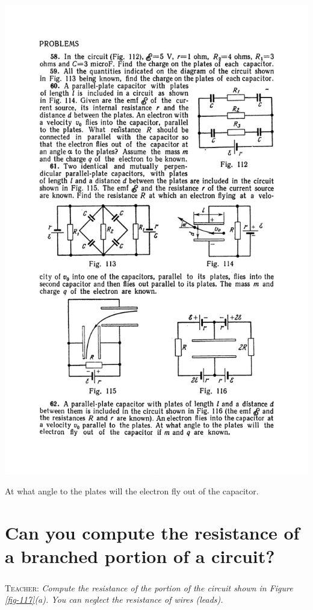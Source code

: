 \documentclass[a4paper,sfsidenotes]{tufte-book}
\begin{document}
\begin{enumerate}[resume=problems]
\begin{marginfigure}
\includegraphics[width=\linewidth]{fig-116a}
\caption{ At what angle to the plates will the electron fly out of the capacitor.}
\label{fig-116}
\end{marginfigure}
\end{enumerate}


\chapter{Can you compute the resistance of a branched portion of a circuit?}
\label{ch-29}
\paragraph{}
\textsc{Teacher:} \emph{Compute the resistance of the portion of the circuit shown in \emph{Figure \ref{fig-117}(a)}. You can neglect the resistance of wires (leads).}
\end{document}

